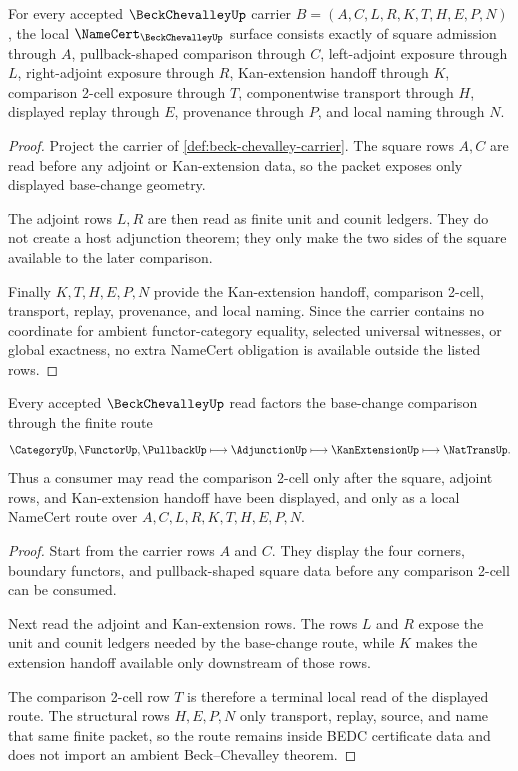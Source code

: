 \begin{theorem}
\label{thm:beck-chevalley-namecert-obligations}
For every accepted $\BeckChevalleyUp$ carrier $B=(A,C,L,R,K,T,H,E,P,N)$, the local $\NameCert_{\BeckChevalleyUp}$ surface consists exactly of square admission through $A$, pullback-shaped comparison through $C$, left-adjoint exposure through $L$, right-adjoint exposure through $R$, Kan-extension handoff through $K$, comparison 2-cell exposure through $T$, componentwise transport through $H$, displayed replay through $E$, provenance through $P$, and local naming through $N$.
\end{theorem}
\begin{proof}
Project the carrier of \autoref{def:beck-chevalley-carrier}. The square rows $A,C$ are read before any adjoint or Kan-extension data, so the packet exposes only displayed base-change geometry.

The adjoint rows $L,R$ are then read as finite unit and counit ledgers. They do not create a host adjunction theorem; they only make the two sides of the square available to the later comparison.

Finally $K,T,H,E,P,N$ provide the Kan-extension handoff, comparison 2-cell, transport, replay, provenance, and local naming. Since the carrier contains no coordinate for ambient functor-category equality, selected universal witnesses, or global exactness, no extra NameCert obligation is available outside the listed rows.
\end{proof}

\begin{theorem}
\label{thm:beck-chevalley-square-route}
Every accepted $\BeckChevalleyUp$ read factors the base-change comparison through the finite route
$$
\CategoryUp,\FunctorUp,\PullbackUp \longmapsto \AdjunctionUp \longmapsto \KanExtensionUp \longmapsto \NatTransUp .
$$
Thus a consumer may read the comparison 2-cell only after the square, adjoint rows, and Kan-extension handoff have been displayed, and only as a local NameCert route over $A,C,L,R,K,T,H,E,P,N$.
\end{theorem}
\begin{proof}
Start from the carrier rows $A$ and $C$. They display the four corners, boundary functors, and pullback-shaped square data before any comparison 2-cell can be consumed.

Next read the adjoint and Kan-extension rows. The rows $L$ and $R$ expose the unit and counit ledgers needed by the base-change route, while $K$ makes the extension handoff available only downstream of those rows.

The comparison 2-cell row $T$ is therefore a terminal local read of the displayed route. The structural rows $H,E,P,N$ only transport, replay, source, and name that same finite packet, so the route remains inside BEDC certificate data and does not import an ambient Beck--Chevalley theorem.
\end{proof}

